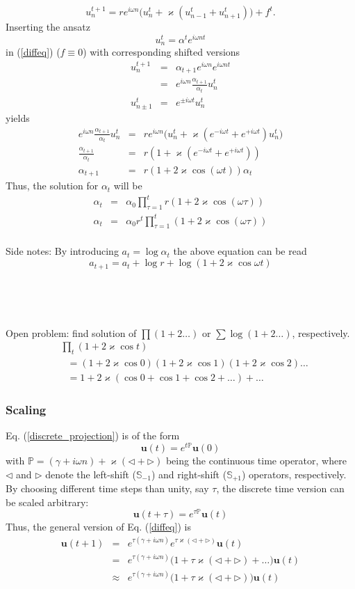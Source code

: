 \documentclass[11pt,twocolumn]{article}
\newcommand{\be}{\begin{equation}}
\newcommand{\ee}{\end{equation}}
\newcommand{\bea}{\begin{eqnarray*}}
\newcommand{\eea}{\end{eqnarray*}}
\newcommand{\w}{\omega}
\newcommand{\ka}{\varkappa}
\newcommand{\leftshift}{\triangleleft}
\newcommand{\rightshift}{\triangleright}
\begin{document}
\be \label{diffeq}
   u_n^{t+1} = re^{i\w n} \big( u_n^t  +  \varkappa ( u_{n-1}^t + u_{n+1}^t ) \big)  +  f^t.
\ee
Inserting the ansatz
\be \label{diffeq_ansatz}
   u_n^t = \alpha^t e^{i\w nt}
\ee
in (\ref{diffeq}) ($f \equiv 0$) with corresponding shifted versions
\bea
    u_n^{t+1}    &=&  \alpha_{t+1} e^{i\w n} e^{i\w nt} \\
                 &=&  e^{i\w n} \frac{\alpha_{t+1}}{\alpha_t} u_n^t \\
    u_{n\pm 1}^t &=&  e^{\pm i\w t} u_n^t
\eea
yields
\bea
    e^{i\w n} \frac{\alpha_{t+1}}{\alpha_t} u_n^t  &=&
        re^{i\w n} \big( u_n^t +  \varkappa ( e^{-i\w t} + e^{+i\w t} ) u_n^t \big) \\
    \frac{\alpha_{t+1}}{\alpha_t}  &=&  r ( 1 + \varkappa ( e^{-i\w t} + e^{+i\w t} )) \\
    \alpha_{t+1}  &=&  r ( 1 + 2 \varkappa \cos(\w t) ) \alpha_t
\eea
Thus, the solution for $\alpha_t$ will be
\bea
    \alpha_t &=& \alpha_0 \prod_{\tau=1}^t r ( 1 + 2 \varkappa \cos(\w \tau) ) \\
    \alpha_t &=& \alpha_0 r^t \prod_{\tau=1}^t ( 1 + 2 \varkappa \cos(\w \tau) ) \\
\eea

Side notes: By introducing $a_t = \log \alpha_t$ the above equation can be read
$$
   a_{t+1} = a_{t} + \log r + \log( 1 + 2\varkappa \cos \w t )
$$

\mbox{ }

\mbox{ }

Open problem: find solution of $\prod(1+2\dots)$ or $\sum\log(1+2\dots)$, respectively.
\be\begin{split}
    &\!\!\!\prod_t (1 + 2\ka\cos t) \\
    &\ \ \ = (1 + 2\ka\cos 0)(1 + 2\ka\cos 1)(1 + 2\ka\cos 2)\dots\\
    &\ \ \ = 1 + 2\ka ( \cos 0 + \cos 1 + \cos 2 + \dots) + \dots
\end{split}\ee



\subsubsection{Scaling}

Eq. (\ref{discrete_projection}) is of the form
$$
  \mathbf{u}(t) = e^{t \mathbb{P}} \mathbf{u}(0)
$$
with $\mathbb{P} = (\gamma + i \w n) + \ka ( \leftshift + \rightshift )$ being the continuous time operator,
where $\leftshift$ and $\rightshift$ denote the left-shift ($\mathbb{S}_{-1}$) and right-shift ($\mathbb{S}_{+1}$)
operators, respectively.
By choosing different time steps than unity, say $\tau$, the discrete time version can be scaled arbitrary:
$$
  \mathbf{u}(t+\tau) = e^{\tau \mathbb{P}} \mathbf{u}(t)
$$
Thus, the general version of Eq. (\ref{diffeq}) is
\bea
  \mathbf{u}(t+1) &=& e^{\tau(\gamma + i \w n)} e^{\tau\ka ( \leftshift + \rightshift )} \mathbf{u}(t)\\
                   &=& e^{\tau(\gamma + i \w n)} \big(1 + \tau\ka ( \leftshift + \rightshift ) + \dots \big) \mathbf{u}(t)\\
             &\approx& e^{\tau(\gamma + i \w n)} \big(1 + \tau\ka ( \leftshift + \rightshift )\big) \mathbf{u}(t)
\eea
\end{document}
